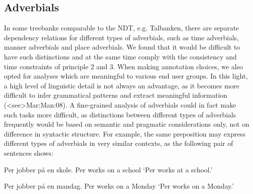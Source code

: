 \documentclass[11pt,a4paper]{article}
\begin{document}
\subsection{Adverbials}
In some treebanks comparable to the NDT, e.g. Talbanken, there are separate dependency relations for different types of adverbials, such as time adverbials, manner adverbials and place adverbials. 
We found that it would be difficult to have such distinctions and at the same time comply with the consistency and time constraints of principle 2 and 3. %
When making annotation choices, we also opted for analyses which are meaningful to various end user groups.
In this light, a high level of linguistic detail is not always an advantage, as it becomes more difficult to infer grammatical patterns and extract meaningful information (\citeNP<see>{Mar:Man:08}).
A fine-grained analysis of adverbials could in fact make such tasks more difficult, as distinctions between different types of adverbials frequently would be based on semantic and pragmatic considerations only, not on difference in syntactic structure.
For example, the same preposition may express different types of adverbials in very similar contexts, as the following pair of sentences shows:

\begin{examples}
\item\label{ex:locadv}
\gll Per jobber på en skole.
Per works on a school
\glt `Per works at a school.'
\glend

\item\label{ex:timeadv}
\gll Per jobber på en mandag.
Per works on a Monday
\glt `Per works on a Monday.'
\glend
\end{examples}
\end{document}
